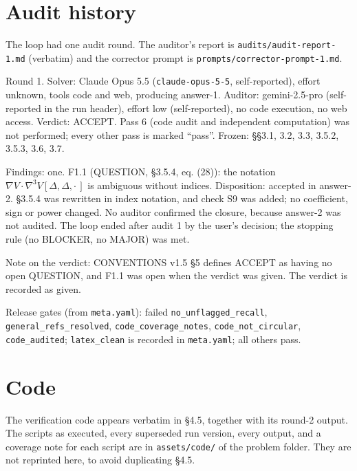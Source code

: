\documentclass[11pt,a4paper]{article}
\begin{document}
\section{Audit history}\label{app:audit}
The loop had one audit round. The auditor's report is \texttt{audits/audit-report-1.md} (verbatim) and the corrector prompt is \texttt{prompts/corrector-prompt-1.md}.

Round 1. Solver: Claude Opus 5.5 (\texttt{claude-opus-5-5}, self-reported), effort unknown, tools code and web, producing answer-1. Auditor: gemini-2.5-pro (self-reported in the run header), effort low (self-reported), no code execution, no web access. Verdict: ACCEPT. Pass 6 (code audit and independent computation) was not performed; every other pass is marked ``pass''. Frozen: §§3.1, 3.2, 3.3, 3.5.2, 3.5.3, 3.6, 3.7.

Findings: one. F1.1 (QUESTION, §3.5.4, eq. (28)): the notation \(\nabla V\cdot\nabla^3V[\Delta,\Delta,\cdot\,]\) is ambiguous without indices. Disposition: accepted in answer-2. §3.5.4 was rewritten in index notation, and check S9 was added; no coefficient, sign or power changed. No auditor confirmed the closure, because answer-2 was not audited. The loop ended after audit 1 by the user's decision; the stopping rule (no BLOCKER, no MAJOR) was met.

Note on the verdict: CONVENTIONS v1.5 §5 defines ACCEPT as having no open QUESTION, and F1.1 was open when the verdict was given. The verdict is recorded as given.

Release gates (from \texttt{meta.yaml}): failed \texttt{no\_unflagged\_recall}, \texttt{general\_refs\_resolved}, \texttt{code\_coverage\_notes}, \texttt{code\_not\_circular}, \texttt{code\_audited}; \texttt{latex\_clean} is recorded in \texttt{meta.yaml}; all others pass.


\section{Code}\label{app:code}
The verification code appears verbatim in §4.5, together with its round-2 output. The scripts as executed, every superseded run version, every output, and a coverage note for each script are in \texttt{assets/code/} of the problem folder. They are not reprinted here, to avoid duplicating §4.5.

\nocite{*}


\end{document}
